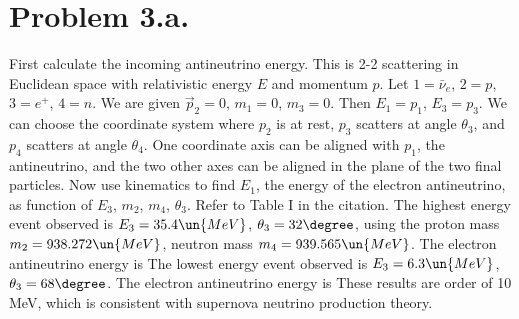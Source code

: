 \documentclass{article}
\begin{document}
\section*{Problem 3.a.}
First calculate the incoming antineutrino energy. This is 2-2 scattering in Euclidean space with relativistic energy $E$ and  momentum $p$. Let $1=\bar{\nu}_e$, $2=p$, $3=e^+$, $4=n$. We are given $\vec{p}_2=0$, $m_1=0$, $m_3=0$. Then $E_1=p_1$, $E_3=p_3$. We can choose the coordinate system where $p_2$ is at rest, $p_3$ scatters at angle $\theta_3$, and $p_4$ scatters at angle $\theta_4$. One coordinate axis can be aligned with $p_1$, the antineutrino, and the two other axes can be aligned in the plane of the two final particles.
Now use kinematics to find $E_1$, the energy of the electron antineutrino, as function of $E_3$, $m_2$, $m_4$, $\theta_3$.
Refer to Table I in the citation. The highest energy event observed is $E_3=35.4\un{MeV}$, $\theta_3=32\degree$, using the proton mass $m_2=938.272\un{MeV}$, neutron mass $m_4=939.565\un{MeV}$. The electron antineutrino energy is
The lowest energy event observed is $E_3=6.3\un{MeV}$, $\theta_3=68\degree$. The electron antineutrino energy is
These results are order of 10 MeV, which is consistent with supernova neutrino production theory.
\end{document}
